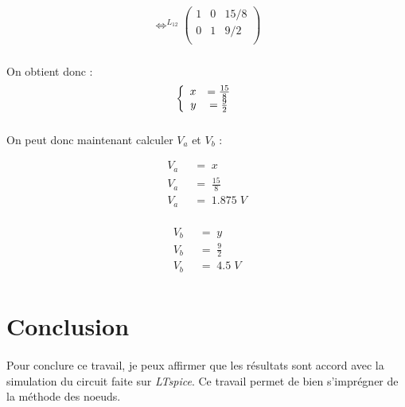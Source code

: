             \[\Leftrightarrow^{L_{12}} \left(
             \begin{array}{cc|c}
                 1 & 0 & 15/8\\
                 0 & 1 & 9/2\\
             \end{array}\right)
            \]
            
            \subparagraph{}On obtient donc :
                \begin{equation*}
                    \left \{
                        \begin{array}{r c l}
                            x & = \frac{15}{8} \\
                            y & = \frac{9}{2}
                        \end{array}
                    \right .
                \end{equation*}
                
            \subparagraph{} On peut donc maintenant calculer $V_a$ et $V_b$ :
            
                \begin{align*}
                    V_a\;&\;=\;x \\
                    V_a\;&\;=\;\frac{15}{8} \\
                    V_a\;&\;=\;1.875\;V \\
                \end{align*}
                
                \begin{align*}
                    V_b\;&\;=\;y \\
                    V_b\;&\;=\;\frac{9}{2} \\
                    V_b\;&\;=\;4.5\;V \\
                \end{align*}

\section{Conclusion}

    \paragraph{}Pour conclure ce travail, je peux affirmer que les résultats sont accord avec la simulation du circuit
    faite sur \textit{LTspice}. Ce travail permet de bien s'imprégner de la méthode des noeuds.



